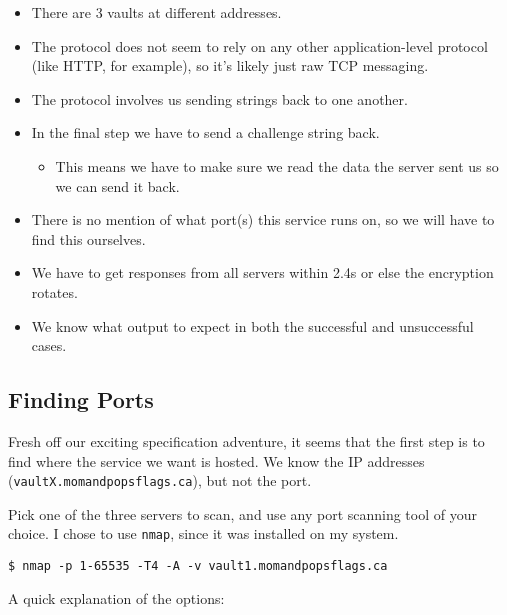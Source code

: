 \documentclass[11pt]{article}
\begin{document}
    \begin{itemize}
        \item There are 3 vaults at different addresses.
        \item The protocol does not seem to rely on any other application-level protocol (like HTTP, for example), so it's likely just raw TCP messaging.
        \item The protocol involves us sending strings back to one another.
        \item In the final step we have to send a challenge string back.
        \begin{itemize}
            \item This means we have to make sure we read the data the server sent us so we can send it back.
        \end{itemize}
        \item There is no mention of what port(s) this service runs on, so we will have to find this ourselves.
        \item We have to get responses from all servers within 2.4s or else the encryption rotates.
        \item We know what output to expect in both the successful and unsuccessful cases.
    \end{itemize}

    \subsection{Finding Ports}\label{subsec:finding-ports}

    Fresh off our exciting specification adventure, it seems that the first step is to find where the service we want is hosted. We know the IP addresses (\verb`vaultX.momandpopsflags.ca`), but not the port.

    Pick one of the three servers to scan, and use any port scanning tool of your choice. I chose to use \verb`nmap`, since it was installed on my system.

    \begin{lstlisting}[gobble=8,label={lst:nmap-command}]
        $ nmap -p 1-65535 -T4 -A -v vault1.momandpopsflags.ca
    \end{lstlisting}

    \pagebreak

    \noindent A quick explanation of the options:
\end{document}
